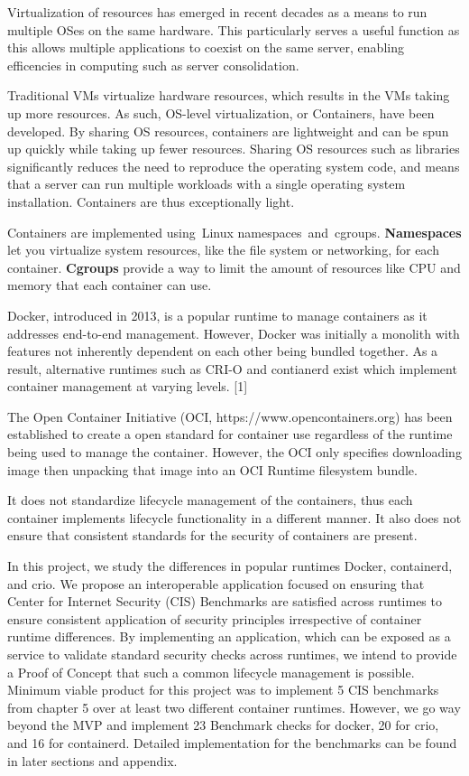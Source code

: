 Virtualization of resources has emerged in recent decades as a means to run multiple OSes on the same hardware. This particularly serves a useful function as this allows multiple applications to coexist on the same server, enabling efficencies in computing such as server consolidation.

Traditional VMs virtualize hardware resources, which results in the VMs taking up more resources. As such, OS-level virtualization, or Containers, have been developed. By sharing OS resources, containers are lightweight and can be spun up quickly while taking up fewer resources.
Sharing OS resources such as libraries significantly reduces the need to reproduce the operating system code, and means that a server can run multiple workloads with a single operating system installation.
Containers are thus exceptionally light.

Containers are implemented using Linux namespaces and cgroups. \textbf{Namespaces} let you virtualize system resources, like the file system or networking, for each container. \textbf{Cgroups} provide a way to limit the amount of resources like CPU and memory that each container can use. 


Docker, introduced in 2013, is a popular runtime to manage containers as it addresses end-to-end management. However, Docker was initially a monolith with features not inherently dependent on each other being bundled together. As a result, alternative runtimes such as CRI-O and contianerd exist which implement container management at varying levels. [1]

The Open Container Initiative (OCI, https://www.opencontainers.org) has been established to create a open standard for container use regardless of the runtime being used to manage the container. However, the OCI only specifies downloading image then unpacking that image into an OCI Runtime filesystem bundle.

It does not standardize lifecycle management of the containers, thus each container implements lifecycle functionality in a different manner. It also does not ensure that consistent standards for the security of containers are present.

In this project, we study the differences in popular runtimes Docker, containerd, and crio. We propose an interoperable application focused on ensuring that Center for Internet Security (CIS) Benchmarks are satisfied across runtimes to ensure consistent application of security principles irrespective of container runtime differences. By implementing an application, which can be exposed as a service to validate standard security checks across runtimes, we intend to provide a Proof of Concept that such a common lifecycle management is possible. Minimum viable product for this project was to implement 5 CIS benchmarks from chapter 5 over at least two different container runtimes. However, we go way beyond the MVP and implement 23 Benchmark checks for docker, 20 for crio, and 16 for containerd. Detailed implementation for the benchmarks can be found in later sections and appendix.  


